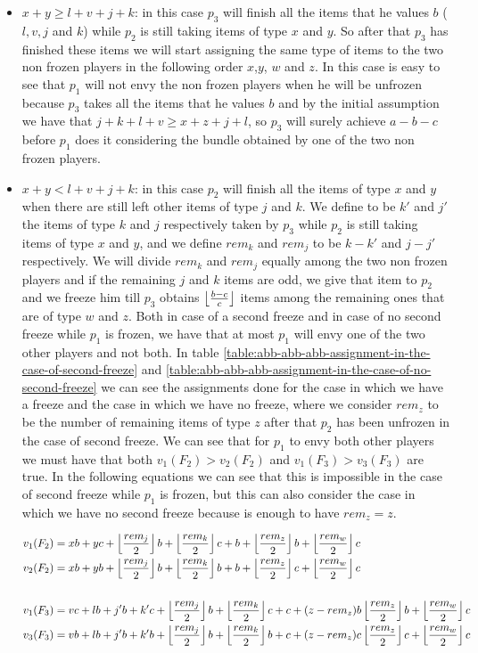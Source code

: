 \begin{itemize}
    \item $x + y \ge l + v + j + k $: in this case $p_3$ will finish all the items that he values $b$ ($l,v,j$ and $k$) while $p_2$ is still taking items of type $x$ and $y$. So after that $p_3$ has finished these items we will start assigning the same type of items to the two non frozen players in the following order $x$,$y$, $w$ and $z$. In this case is easy to see that $p_1$ will not envy the non frozen players when he will be unfrozen because $p_3$ takes all the items that he values $b$ and by the initial assumption we have that $j + k + l + v \ge x + z + j + l$, so $p_3$ will surely achieve $a-b-c$ before $p_1$ does it considering the bundle obtained by one of the two non frozen players.
    \item $x + y < l + v + j + k $: in this case $p_2$ will finish all the items of type $x$ and $y$ when there are still left other items of type $j$ and $k$. We define to be $k'$ and $j'$ the items of type $k$ and $j$ respectively taken by $p_3$ while $p_2$ is still taking items of type $x$ and $y$, and we define $rem_k$ and $rem_j$ to be $k-k'$ and $j-j'$ respectively. We will divide $rem_k$ and $rem_j$ equally among the two non frozen players and if the remaining $j$ and $k$ items are odd, we give that item to $p_2$ and we freeze him till $p_3$ obtains $\left \lfloor\frac{b-c}{c}\right \rfloor$ items among the remaining ones that are of type $w$ and $z$. 
    Both in case of a second freeze and in case of no second freeze while $p_1$ is frozen, we have that at most $p_1$ will envy one of the two other players and not both. In table \ref{table:abb-abb-abb-assignment-in-the-case-of-second-freeze} and  \ref{table:abb-abb-abb-assignment-in-the-case-of-no-second-freeze} we can see the assignments done for the case in which we have a freeze and the case in which we have no freeze, where we consider $rem_z$ to be the number of remaining items of type $z$ after that $p_2$ has been unfrozen in the case of second freeze.
    We can see that for $p_1$ to envy both other players we must have that both $v_1(F_2) > v_2(F_2)$ and $v_1(F_3) > v_3(F_3)$ are true. In the following equations we can see that this is impossible in the case of second freeze while $p_1$ is frozen, but this can also consider the case in which we have no second freeze because is enough to have $rem_z = z$.
    
    \begin{align*}
        v_1(F_2) &= xb + yc + \left \lfloor\frac{rem_j}{2}\right \rfloor b + \left \lfloor\frac{rem_k}{2}\right \rfloor c + b + \left \lfloor\frac{rem_z}{2}\right \rfloor b + \left \lfloor\frac{rem_w}{2}\right \rfloor c\\
        v_2(F_2) &= xb + yb + \left \lfloor\frac{rem_j}{2}\right \rfloor b + \left \lfloor\frac{rem_k}{2}\right \rfloor b + b + \left \lfloor\frac{rem_z}{2}\right \rfloor c + \left \lfloor\frac{rem_w}{2}\right \rfloor c\\
        \\
        v_1(F_3) &= vc + lb + j'b + k'c + \left \lfloor\frac{rem_j}{2}\right \rfloor b + \left \lfloor\frac{rem_k}{2}\right \rfloor c + c + (z-rem_z)b \left \lfloor\frac{rem_z}{2}\right \rfloor b + \left \lfloor\frac{rem_w}{2}\right \rfloor c\\
        v_3(F_3) &= vb + lb + j'b + k'b + \left \lfloor\frac{rem_j}{2}\right \rfloor b + \left \lfloor\frac{rem_k}{2}\right \rfloor b + c + (z-rem_z)c \left \lfloor\frac{rem_z}{2}\right \rfloor c + \left \lfloor\frac{rem_w}{2}\right \rfloor c
    \end{align*}
       

\end{itemize}
